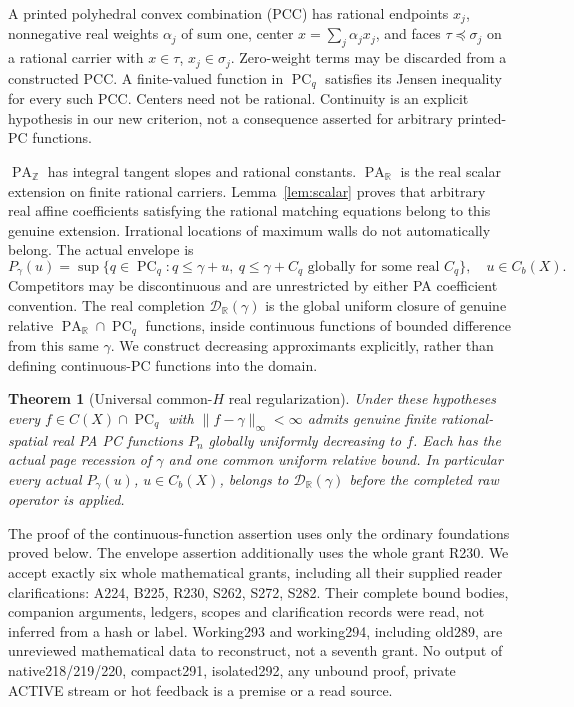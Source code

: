 \documentclass[11pt]{article}
\newtheorem{theorem}{Theorem}[section]
\newcommand{\R}{\mathbb R}
\newcommand{\Z}{\mathbb Z}
\newcommand{\PC}{\operatorname{PC}_q}
\newcommand{\PA}{\operatorname{PA}}
\newcommand{\Dcal}{\mathcal D_{\R}(\gamma)}
\begin{document}
A printed polyhedral convex combination (PCC) has rational endpoints $x_j$, nonnegative real weights $\alpha_j$ of sum one, center $x=\sum_j\alpha_jx_j$, and faces $\tau\preceq\sigma_j$ on a rational carrier with $x\in\tau$, $x_j\in\sigma_j$. Zero-weight terms may be discarded from a constructed PCC. A finite-valued function in $\PC$ satisfies its Jensen inequality for every such PCC. Centers need not be rational. Continuity is an explicit hypothesis in our new criterion, not a consequence asserted for arbitrary printed-PC functions.

$\PA_\Z$ has integral tangent slopes and rational constants. $\PA_\R$ is the real scalar extension on finite rational carriers. Lemma~\ref{lem:scalar} proves that arbitrary real affine coefficients satisfying the rational matching equations belong to this genuine extension. Irrational locations of maximum walls do not automatically belong. The actual envelope is
\[
 P_\gamma(u)=\sup\{q\in\PC:q\leq\gamma+u,\ q\leq\gamma+C_q\text{ globally for some real }C_q\},\quad u\in C_b(X).
\]
Competitors may be discontinuous and are unrestricted by either PA coefficient convention. The real completion $\Dcal$ is the global uniform closure of genuine relative $\PA_\R\cap\PC$ functions, inside continuous functions of bounded difference from this same $\gamma$. We construct decreasing approximants explicitly, rather than defining continuous-PC functions into the domain.

\begin{theorem}[Universal common-$H$ real regularization]\label{thm:main}
Under these hypotheses every $f\in C(X)\cap\PC$ with $\|f-\gamma\|_\infty<\infty$ admits genuine finite rational-spatial real PA PC functions $P_n$ globally uniformly decreasing to $f$. Each has the actual page recession of $\gamma$ and one common uniform relative bound. In particular every actual $P_\gamma(u)$, $u\in C_b(X)$, belongs to $\Dcal$ before the completed raw operator is applied.
\end{theorem}

The proof of the continuous-function assertion uses only the ordinary foundations proved below. The envelope assertion additionally uses the whole grant R230. We accept exactly six whole mathematical grants, including all their supplied reader clarifications: A224, B225, R230, S262, S272, S282. Their complete bound bodies, companion arguments, ledgers, scopes and clarification records were read, not inferred from a hash or label. Working293 and working294, including old289, are unreviewed mathematical data to reconstruct, not a seventh grant. No output of native218/219/220, compact291, isolated292, any unbound proof, private ACTIVE stream or hot feedback is a premise or a read source.
\end{document}
